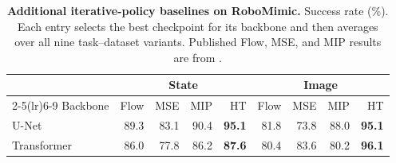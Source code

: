 \begin{table}[t]
  \centering
  \caption{\textbf{Additional iterative-policy baselines on RoboMimic.}
  Success rate (\%). Each entry selects the best checkpoint for its backbone
  and then averages over all nine task--dataset variants. Published Flow, MSE,
  and MIP results are from \citet{pan2026much}.}
  \label{tab:robomimic-iterative-appendix}
  \small
  \setlength{\tabcolsep}{4pt}
  \begin{tabular}{@{}lrrrrrrrr@{}}
    \toprule
    & \multicolumn{4}{c}{State} & \multicolumn{4}{c}{Image} \\
    \cmidrule(lr){2-5}\cmidrule(lr){6-9}
    Backbone & Flow & MSE & MIP & HT & Flow & MSE & MIP & HT \\
    \midrule
    U-Net       & 89.3 & 83.1 & 90.4 & \textbf{95.1}
                & 81.8 & 73.8 & 88.0 & \textbf{95.1} \\
    Transformer & 86.0 & 77.8 & 86.2 & \textbf{87.6}
                & 80.4 & 83.6 & 80.2 & \textbf{96.1} \\
    \bottomrule
  \end{tabular}
\end{table}
